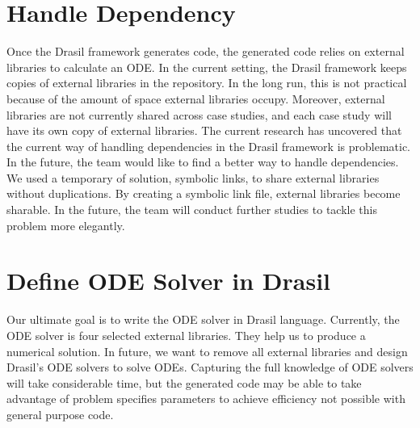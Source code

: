 \section{Handle Dependency}
Once the Drasil framework generates code, the generated code relies on external libraries to calculate an ODE. In the current setting, the Drasil framework keeps copies of external libraries in the repository. In the long run, this is not practical because of the amount of space external libraries occupy. Moreover, external libraries are not currently shared across case studies, and each case study will have its own copy of external libraries. The current research has uncovered that the current way of handling dependencies in the Drasil framework is problematic. In the future, the team would like to find a better way to handle dependencies. We used a temporary of solution, symbolic links, to share external libraries without duplications. By creating a symbolic link file, external libraries become sharable. In the future, the team will conduct further studies to tackle this problem more elegantly.

\section{Define ODE Solver in Drasil}
Our ultimate goal is to write the ODE solver in Drasil language. Currently, the ODE solver is four selected external libraries. They help us to produce a numerical solution. In future, we want to remove all external libraries and design Drasil's ODE solvers to solve ODEs. Capturing the full knowledge of ODE solvers will take considerable time, but the generated code may be able to take advantage of problem specifies parameters to achieve efficiency not possible with general purpose code.
